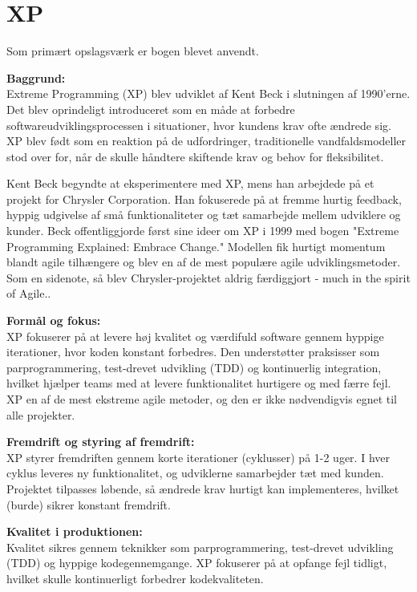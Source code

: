 \chapter{XP}
\label{chapter:2ndchapter}
Som primært opslagsværk er bogen \cite{beck2004xp} blevet anvendt.

\textbf{Baggrund:}\\
Extreme Programming (XP) blev udviklet af Kent Beck i slutningen af 1990'erne. 
Det blev oprindeligt introduceret som en måde at forbedre softwareudviklingsprocessen i situationer, 
hvor kundens krav ofte ændrede sig. XP blev født som en reaktion på de udfordringer, 
traditionelle vandfaldsmodeller stod over for, når de skulle håndtere skiftende krav og behov for fleksibilitet.

Kent Beck begyndte at eksperimentere med XP, mens han arbejdede på et projekt for Chrysler Corporation. 
Han fokuserede på at fremme hurtig feedback, hyppig udgivelse af små funktionaliteter og tæt samarbejde mellem udviklere og kunder. 
Beck offentliggjorde først sine ideer om XP i 1999 med bogen "Extreme Programming Explained: Embrace Change." 
Modellen fik hurtigt momentum blandt agile tilhængere og blev en af de mest populære agile udviklingsmetoder.
Som en sidenote, så blev Chrysler-projektet aldrig færdiggjort - much in the spirit of Agile.. 

\textbf{Formål og fokus:}\\
XP fokuserer på at levere høj kvalitet og værdifuld software gennem hyppige iterationer, hvor koden konstant forbedres. 
Den understøtter praksisser som parprogrammering, test-drevet udvikling (TDD) og kontinuerlig integration, hvilket hjælper teams med at levere funktionalitet hurtigere og med færre fejl.
XP en af de mest ekstreme agile metoder, og den er ikke nødvendigvis egnet til alle projekter.

\textbf{Fremdrift og styring af fremdrift:}\\
XP styrer fremdriften gennem korte iterationer (cyklusser) på 1-2 uger. I hver cyklus leveres ny funktionalitet, og udviklerne samarbejder tæt med kunden. Projektet tilpasses løbende, så ændrede krav hurtigt kan implementeres, hvilket (burde) sikrer konstant fremdrift.

\textbf{Kvalitet i produktionen:}\\
Kvalitet sikres gennem teknikker som parprogrammering, test-drevet udvikling (TDD) og hyppige kodegennemgange. XP fokuserer på at opfange fejl tidligt, hvilket skulle kontinuerligt forbedrer kodekvaliteten.

